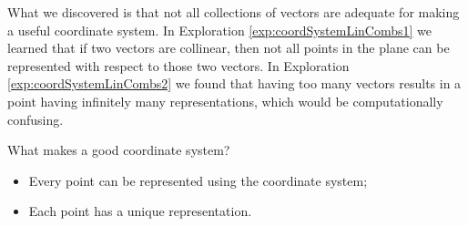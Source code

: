 \documentclass{ximera}
\begin{document}
What we discovered is that not all collections of vectors are adequate for making a useful coordinate system. In Exploration \ref{exp:coordSystemLinCombs1} we learned that if two vectors are collinear, then not all points in the plane can be represented with respect to those two vectors.  In Exploration \ref{exp:coordSystemLinCombs2} we found that having too many vectors results in a point having infinitely many representations, which would be computationally confusing.  

\begin{idea}
    What makes a good coordinate system?
   \begin{itemize}
\item Every point can be represented using the coordinate system;
\item Each point has a unique representation.
\end{itemize}
\end{idea}
\end{document}
